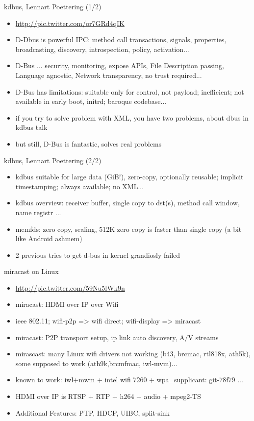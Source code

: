 \documentclass[aspectratio=169]{beamer}
\begin{document}
\begin{frame}{kdbus, Lennart Poettering (1/2)}
  \begin{itemize}
  \item \url{http://pic.twitter.com/or7GRd4qIK}
  \item D-Dbus is powerful IPC: method call transactions, signals, properties, broadcasting, discovery, introspection, policy, activation...
  \item D-Bus ... security, monitoring, expose APIs, File Description passing, Language agnostic, Network transparency, no trust required...
  \item D-Bus has limitations: suitable only for control, not payload; inefficient; not available in early boot, initrd; baroque codebase...
  \item if you try to solve problem with XML, you have two problems, about dbus in kdbus talk
  \item but still, D-Bus is fantastic, solves real problems
  \end{itemize}
\end{frame}
  
\begin{frame}{kdbus, Lennart Poettering (2/2)}
  \begin{itemize}
  \item kdbus suitable for large data (GiB!), zero-copy, optionally reusable; implicit timestamping; always available; no XML...
  \item kdbus overview: receiver buffer, single copy to dst(s), method call window, name registr ...
  \item memfds: zero copy, sealing, 512K zero copy is faster than single copy (a bit like Android ashmem)
  \item 2 previous tries to get d-bus in kernel grandiosly failed
  \end{itemize}
\end{frame}
 
\begin{frame}{miracast on Linux}
  \begin{itemize}
  \item \url{http://pic.twitter.com/59Nu5lWk9n}
  \item miracast: HDMI over IP over Wifi
  \item ieee 802.11; wifi-p2p => wifi direct; wifi-display => miracast
  \item miracast: P2P transport setup, ip link auto discovery, A/V streams
  \item mirascast: many Linux wifi drivers not working (b43, brcmac, rtl818x, ath5k), some supposed to work (ath9k,brcmfmac, iwl-mvm)...
  \item known to work: iwl+mwm + intel wifi 7260 + wpa\_supplicant: git-78f79 ...
  \item HDMI over IP is RTSP + RTP + h264 + audio + mpeg2-TS
  \item Additional Features: PTP, HDCP, UIBC, split-sink
  \end{itemize}
\end{frame}
\end{document}
